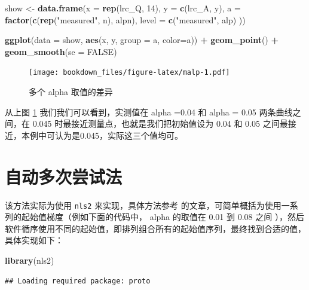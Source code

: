 \documentclass[]{krantz}
\makeatletter
\newenvironment{Shaded}{\begin{snugshade}}{\end{snugshade}}
\newcommand{\KeywordTok}[1]{\textcolor[rgb]{0.13,0.29,0.53}{\textbf{#1}}}
\newcommand{\DataTypeTok}[1]{\textcolor[rgb]{0.13,0.29,0.53}{#1}}
\newcommand{\DecValTok}[1]{\textcolor[rgb]{0.00,0.00,0.81}{#1}}
\newcommand{\StringTok}[1]{\textcolor[rgb]{0.31,0.60,0.02}{#1}}
\newcommand{\OtherTok}[1]{\textcolor[rgb]{0.56,0.35,0.01}{#1}}
\newcommand{\OperatorTok}[1]{\textcolor[rgb]{0.81,0.36,0.00}{\textbf{#1}}}
\newcommand{\NormalTok}[1]{#1}
\newenvironment{kframe}{%
\medskip{}
\setlength{\fboxsep}{.8em}
 \def\at@end@of@kframe{}%
 \ifinner\ifhmode%
  \def\at@end@of@kframe{\end{minipage}}%
  \begin{minipage}{\columnwidth}%
 \fi\fi%
 \def\FrameCommand##1{\hskip\@totalleftmargin \hskip-\fboxsep
 \colorbox{shadecolor}{##1}\hskip-\fboxsep
     \hskip-\linewidth \hskip-\@totalleftmargin \hskip\columnwidth}%
 \MakeFramed {\advance\hsize-\width
   \@totalleftmargin\z@ \linewidth\hsize
   \@setminipage}}%
 {\par\unskip\endMakeFramed%
 \at@end@of@kframe}
\renewenvironment{Shaded}{\begin{kframe}}{\end{kframe}}
\theoremstyle{definition}
\theoremstyle{definition}
\theoremstyle{definition}
\theoremstyle{remark}
\makeatother
\begin{document}
\begin{Shaded}
\begin{Highlighting}[]
\NormalTok{show <-}\StringTok{ }\KeywordTok{data.frame}\NormalTok{(}\DataTypeTok{x =} \KeywordTok{rep}\NormalTok{(lrc_Q, }\DecValTok{14}\NormalTok{),}
           \DataTypeTok{y =} \KeywordTok{c}\NormalTok{(lrc_A, y), }
           \DataTypeTok{a =} \KeywordTok{factor}\NormalTok{(}\KeywordTok{c}\NormalTok{(}\KeywordTok{rep}\NormalTok{(}\StringTok{"measured"}\NormalTok{, n), alpn),}
           \DataTypeTok{level =} \KeywordTok{c}\NormalTok{(}\StringTok{"measured"}\NormalTok{, alp)}
\NormalTok{             ))}

\KeywordTok{ggplot}\NormalTok{(}\DataTypeTok{data =}\NormalTok{ show, }\KeywordTok{aes}\NormalTok{(x, y, }\DataTypeTok{group =}\NormalTok{ a, }\DataTypeTok{color=}\NormalTok{a)) }\OperatorTok{+}\StringTok{ }
\StringTok{  }\KeywordTok{geom_point}\NormalTok{() }\OperatorTok{+}\StringTok{ }
\StringTok{  }\KeywordTok{geom_smooth}\NormalTok{(}\DataTypeTok{se =} \OtherTok{FALSE}\NormalTok{) }
\end{Highlighting}
\end{Shaded}

\begin{figure}
\centering
\texttt{[image: bookdown\_files/figure-latex/malp-1.pdf]}
\caption{\label{fig:malp}多个 alpha 取值的差异}
\end{figure}

从上图 \ref{fig:malp} 我们我们可以看到，实测值在 alpha =0.04 和 alpha =
0.05 两条曲线之间，在 0.045 时最接近测量点，也就是我们把初始值设为 0.04
和 0.05 之间最接近，本例中可认为是0.045，实际这三个值均可。

\section{自动多次尝试法}\label{mult_try}

该方法实际为使用 \texttt{nls2} 来实现，具体方法参考 \citet{nls2}
的文章，可简单概括为使用一系列的起始值梯度（例如下面的代码中， alpha
的取值在 0.01 到 0.08 之间
），然后软件循序使用不同的起始值，即排列组合所有的起始值序列，最终找到合适的值，具体实现如下：

\begin{Shaded}
\begin{Highlighting}[]
\KeywordTok{library}\NormalTok{(nls2)}
\end{Highlighting}
\end{Shaded}

\begin{verbatim}
## Loading required package: proto
\end{verbatim}
\end{document}
